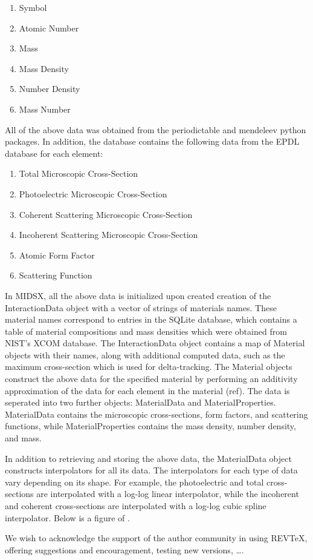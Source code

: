 \documentclass[%
 aip,
cp,  %
 amsmath,amssymb,%
reprint,%
]{revtex4-2}
\begin{document}
\begin{enumerate}
    \item Symbol
    \item Atomic Number
    \item Mass
    \item Mass Density
    \item Number Density
    \item Mass Number
\end{enumerate}

All of the above data was obtained from the periodictable and mendeleev python packages. In addition, the database contains the following data from the EPDL database for each element:

\begin{enumerate}
    \item Total Microscopic Cross-Section
    \item Photoelectric Microscopic Cross-Section
    \item Coherent Scattering Microscopic Cross-Section
    \item Incoherent Scattering Microscopic Cross-Section
    \item Atomic Form Factor
    \item Scattering Function
\end{enumerate}

\par In MIDSX, all the above data is initialized upon created creation of the InteractionData object with a vector of strings of materials names. These material names correspond to entries in the SQLite database, which contains a table of material compositions and mass densities which were obtained from NIST's XCOM database. The InteractionData object contains a map of Material objects with their names, along with additional computed data, such as the maximum cross-section which is used for delta-tracking. The Material objects construct the above data for the specified material by performing an additivity approximation of the data for each element in the material (ref). The data is seperated into two further objects: MaterialData and MaterialProperties. MaterialData contains the microscopic cross-sections, form factors, and scattering functions, while MaterialProperties contains the mass density, number density, and mass.

In addition to retrieving and storing the above data, the MaterialData object constructs interpolators for all its data. The interpolators for each type of data vary depending on its shape. For example, the photoelectric and total cross-sections are interpolated with a log-log linear interpolator, while the incoherent and coherent cross-sections are interpolated with a log-log cubic spline interpolator. Below is a figure of .\\








\begin{acknowledgments}
We wish to acknowledge the support of the author community in using
REV\TeX{}, offering suggestions and encouragement, testing new versions,
\dots.
\end{acknowledgments}

\nocite{*}

\end{document}
